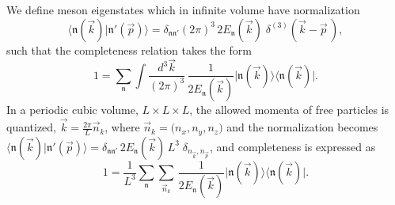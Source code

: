 \documentclass[twocolumn,amsmath,amssymb,prd,10pt,floatfix, 
superscriptaddress,nofootinbib, showpacs, preprintnumbers]{revtex4-1}
\begin{document}
We define meson eigenstates which in infinite volume have normalization
\begin{equation}
 \big\langle \mathfrak{n}(\vec{k}) \big| \mathfrak{n}'(\vec{p}) \big\rangle = \delta_{\mathfrak{n}\mathfrak{n}'}(2\pi)^3 \, 2 E_{\mathfrak{n}}(\vec{k}) \; \delta^{(3)}( \vec{k} - \vec{p} \,), \nonumber
\end{equation}
such that the completeness relation takes the form
\begin{equation}
1 = \sum_\mathfrak{n} \int \!\! \frac{d^3 \vec{k} }{(2\pi)^3} \, \frac{1}{2  E_{\mathfrak{n}}(\vec{k})  } 
	\big| \mathfrak{n}(\vec{k}) \big\rangle \big\langle \mathfrak{n}(\vec{k}) \big|.\nonumber
\end{equation}
In a periodic cubic volume, $L \times L \times L$, the allowed momenta of free particles is quantized, $\vec{k} = \tfrac{2\pi}{L} \vec{n}_k$, where $\vec{n}_k = \big(n_x, n_y, n_z \big)$ and the normalization  becomes $\big\langle \mathfrak{n}(\vec{k}) \big| \mathfrak{n}'(\vec{p}) \big\rangle = \delta_{\mathfrak{n}\mathfrak{n}'} \, 2 E_{\mathfrak{n}}(\vec{k}) \, L^3 \; \delta_{n_{\vec{k}},n_{\vec{p}}  }$, and completeness is expressed as
\begin{equation}
1 = \frac{1}{L^3} \sum_\mathfrak{n} \sum_{\vec{n}_k} \, \frac{1}{2 E_{\mathfrak{n}}(\vec{k}) } 
	\big| \mathfrak{n}(\vec{k}) \big\rangle \big\langle \mathfrak{n}(\vec{k}) \big|. \label{completeness}
\end{equation}
\end{document}
